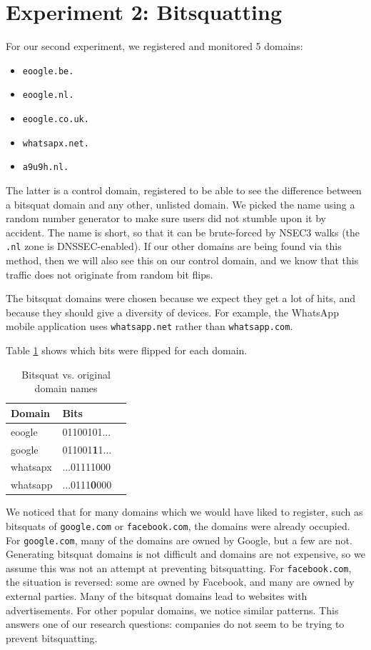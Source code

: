 \documentclass[conference]{IEEEtran}
\begin{document}
\section{Experiment 2: Bitsquatting}\label{sec:exp2}

For our second experiment, we registered and monitored 5 domains:

\begin{itemize}
  \item \texttt{eoogle.be.}
  \item \texttt{eoogle.nl.}
  \item \texttt{eoogle.co.uk.}
  \item \texttt{whatsapx.net.}
  \item \texttt{a9u9h.nl.}
\end{itemize}

The latter is a control domain, registered to be able to see the difference
between a bitsquat domain and any other, unlisted domain. We picked the
name using a random number generator to make sure users did not stumble upon it
by accident. The name is short, so that it can be brute-forced by NSEC3 walks
(the \texttt{.nl} zone is DNSSEC-enabled). If our other domains are being found
via this method, then we will also see this on our control domain, and we know
that this traffic does not originate from random bit flips.

The bitsquat domains were chosen because we expect they get a lot of hits, and
because they should give a diversity of devices. For example, the WhatsApp
mobile application uses \texttt{whatsapp.net} rather than
\texttt{whatsapp.com}.

Table \ref{tab:bits} shows which bits were flipped for each domain.

\begin{table}[H]
  \centering
  \caption{Bitsquat vs. original domain names}
  \label{tab:bits}
  \begin{tabular}{|l|l|l|}
    \hline
    \textbf{Domain}   & \textbf{Bits} \\ \hline
    eoogle   & 01100101... \\ \hline
    google   & 011001\textbf{1}1... \\ \hline
    whatsapx & ...01111000 \\ \hline
    whatsapp & ...0111\textbf{0}000 \\ \hline
   \end{tabular}
\end{table}

We noticed that for many domains which we would have liked to register, such as
bitsquats of \texttt{google.com} or \texttt{facebook.com}, the domains were
already occupied. For \texttt{google.com}, many of the domains are owned by
Google, but a few are not. Generating bitsquat domains is not difficult and
domains are not expensive, so we assume this was not an attempt at preventing
bitsquatting. For \texttt{facebook.com}, the situation is reversed: some are
owned by Facebook, and many are owned by external parties. Many of the bitsquat
domains lead to websites with advertisements. For other popular domains, we
notice similar patterns. This answers one of our research questions: companies
do not seem to be trying to prevent bitsquatting.
\end{document}
